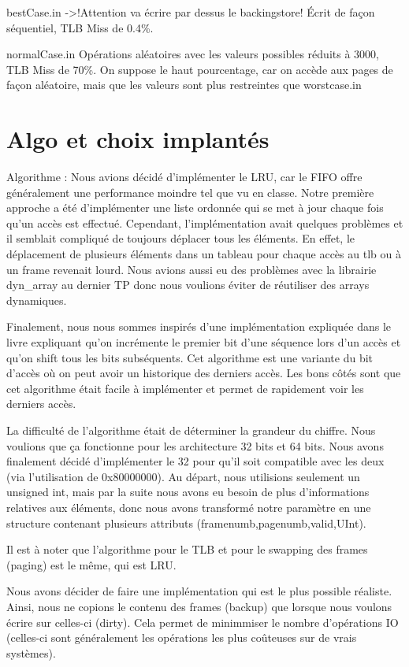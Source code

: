 \documentclass{article}
\begin{document}
bestCase.in ->!Attention va écrire par dessus le backingstore!
Écrit de façon séquentiel, TLB Miss de 0.4\%.

normalCase.in
Opérations aléatoires avec les valeurs possibles réduits à 3000, TLB Miss de 70\%. On suppose le haut pourcentage, car on accède aux pages de façon aléatoire, mais que les valeurs sont plus restreintes que worstcase.in

\section{Algo et choix implantés}
\par
Algorithme : Nous avions décidé d’implémenter le LRU, car le FIFO offre généralement une performance moindre tel que vu en classe. Notre première approche a été d’implémenter une liste ordonnée qui se met à jour chaque fois qu’un accès est effectué. Cependant, l’implémentation avait quelques problèmes et il semblait compliqué de toujours déplacer tous les éléments. En effet, le déplacement de plusieurs éléments dans un tableau pour chaque accès au tlb ou à un frame revenait lourd. Nous avions aussi eu des problèmes avec la librairie dyn\_array au dernier TP donc nous voulions éviter de réutiliser des arrays dynamiques. 

Finalement, nous nous sommes inspirés d’une implémentation expliquée dans le livre expliquant qu’on incrémente le premier bit d’une séquence lors d’un accès et qu’on shift tous les bits subséquents. Cet algorithme est une variante du bit d’accès où on peut avoir un historique des derniers accès. Les bons côtés sont que cet algorithme était facile à implémenter et permet de rapidement voir les derniers accès. 

La difficulté de l’algorithme était de déterminer la grandeur du chiffre. Nous voulions que ça fonctionne pour les architecture 32 bits et 64 bits. Nous avons finalement décidé d’implémenter le 32 pour qu’il soit compatible avec les deux (via l’utilisation de 0x80000000). Au départ, nous utilisions seulement un unsigned int, mais par la suite nous avons eu besoin de plus d’informations relatives aux éléments, donc nous avons transformé notre paramètre en une structure contenant plusieurs attributs (framenumb,pagenumb,valid,UInt).

Il est à noter que l’algorithme pour le TLB et pour le swapping des frames (paging) est le même, qui est LRU.

\par
Nous avons décider de faire une implémentation qui est le plus possible réaliste. Ainsi, nous ne copions le contenu des frames (backup) que lorsque nous voulons écrire sur celles-ci (dirty). Cela permet de minimmiser le nombre d’opérations IO (celles-ci sont généralement les opérations les plus coûteuses sur de vrais systèmes). 
\end{document}
